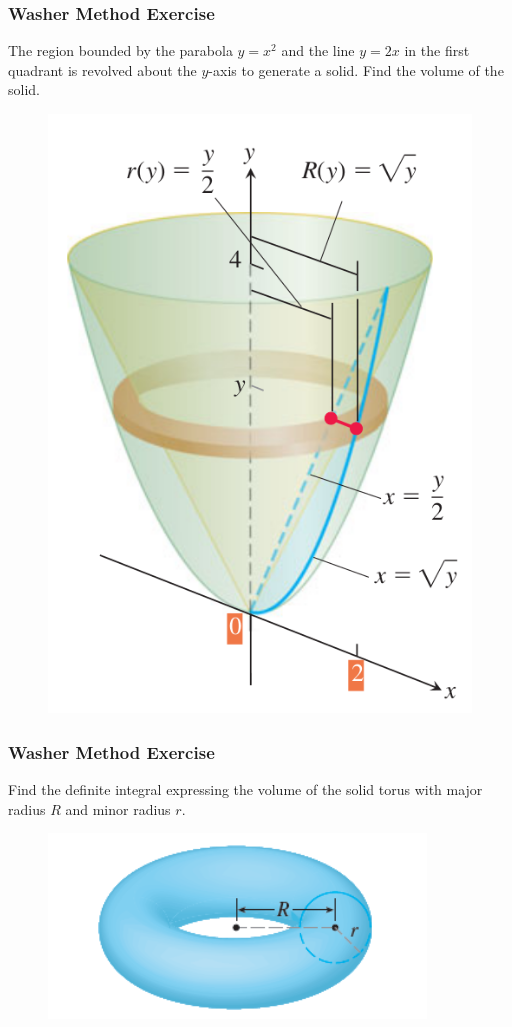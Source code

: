 \documentclass[xcolor=dvipsnames]{beamer}
\begin{document}
\begin{frame}
  \frametitle{Washer Method Exercise}
{\ubung} The region bounded by the parabola $y=x^{2}$ and the line
$y=2x$ in the first quadrant is revolved about the $y$-axis to
generate a solid. Find the volume of the solid.
\begin{figure}[h]
  \includegraphics[scale=0.25]{./diagrams/radii.png}
\end{figure}
\end{frame}

\begin{frame}
  \frametitle{Washer Method Exercise}
  {\ubung} Find the definite integral expressing the volume of the
  solid torus with major radius $R$ and minor radius $r$.
\begin{figure}[h]
  \includegraphics[scale=0.25]{./diagrams/torus.png}
\end{figure}
\end{frame}
\end{document}
